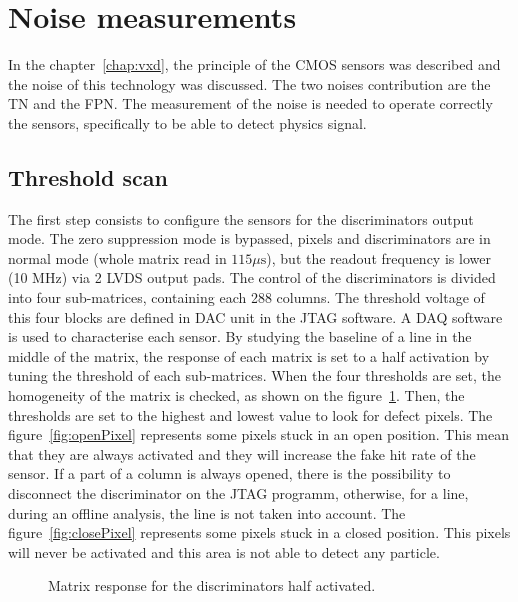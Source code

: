 \section{Noise measurements}

  In the chapter~\ref{chap:vxd}, the principle of the \gls{CMOS} sensors was described and the noise of this technology was discussed.
  The two noises contribution are the \acrfull{TN} and the \acrfull{FPN}.
  The measurement of the noise is needed to operate correctly the sensors, specifically to be able to detect physics signal. 

  \subsection{Threshold scan}

  The first step consists to configure the sensors for the discriminators output mode.
  The zero suppression mode is bypassed, pixels and discriminators are in normal mode (whole matrix read in $115\mu\text{s}$), but the readout frequency is lower (10 MHz) via 2 LVDS output pads.
  The control of the discriminators is divided into four sub-matrices, containing each 288 columns.
  The threshold voltage of this four blocks are defined in DAC unit in the JTAG software.
  A DAQ software is used to characterise each sensor. 
  By studying the baseline of a line in the middle of the matrix, the response of each matrix is set to a half activation by tuning the threshold of each sub-matrices.
  When the four thresholds are set, the homogeneity of the matrix is checked, as shown on the figure~\ref{fig:homogeneityMi26}.
  Then, the thresholds are set to the highest and lowest value to look for defect pixels.
  The figure~\ref{fig:openPixel} represents some pixels stuck in an open position.
  This mean that they are always activated and they will increase the fake hit rate of the sensor.
  If a part of a column is always opened, there is the possibility to disconnect the discriminator on the JTAG programm, otherwise, for a line, during an offline analysis, the line is not taken into account.
  The figure~\ref{fig:closePixel} represents some pixels stuck in a closed position.
  This pixels will never be activated and this area is not able to detect any particle.

  \begin{figure}[!h]
    \caption{Matrix response for the discriminators half activated.}
    \label{fig:homogeneityMi26}
  \end{figure}

